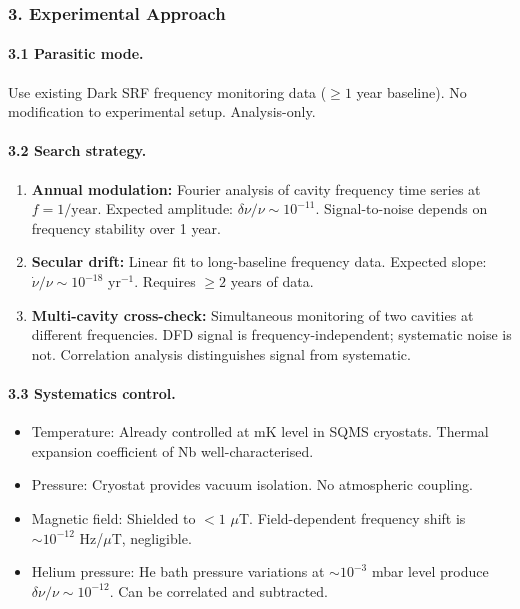 \documentclass[11pt,a4paper]{article}
\begin{document}
\subsubsection*{3. Experimental Approach}

\paragraph{3.1 Parasitic mode.} Use existing Dark SRF frequency monitoring data ($\geq 1$ year baseline). No modification to experimental setup. Analysis-only.

\paragraph{3.2 Search strategy.}
\begin{enumerate}
\item \textbf{Annual modulation:} Fourier analysis of cavity frequency time series at $f = 1/\text{year}$. Expected amplitude: $\delta\nu/\nu \sim 10^{-11}$. Signal-to-noise depends on frequency stability over 1 year.
\item \textbf{Secular drift:} Linear fit to long-baseline frequency data. Expected slope: $\dot\nu/\nu \sim 10^{-18}$ yr$^{-1}$. Requires $\geq 2$ years of data.
\item \textbf{Multi-cavity cross-check:} Simultaneous monitoring of two cavities at different frequencies. DFD signal is frequency-independent; systematic noise is not. Correlation analysis distinguishes signal from systematic.
\end{enumerate}

\paragraph{3.3 Systematics control.}
\begin{itemize}
\item Temperature: Already controlled at mK level in SQMS cryostats. Thermal expansion coefficient of Nb well-characterised.
\item Pressure: Cryostat provides vacuum isolation. No atmospheric coupling.
\item Magnetic field: Shielded to $< 1$ $\mu$T. Field-dependent frequency shift is $\sim 10^{-12}$ Hz/$\mu$T, negligible.
\item Helium pressure: He bath pressure variations at $\sim 10^{-3}$ mbar level produce $\delta\nu/\nu \sim 10^{-12}$. Can be correlated and subtracted.
\end{itemize}
\end{document}
